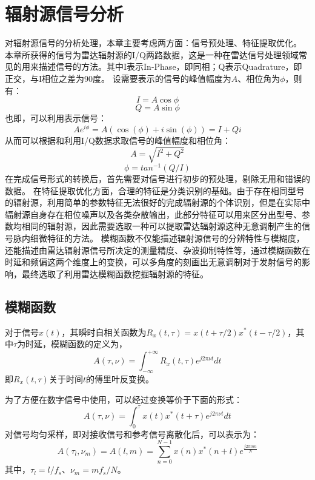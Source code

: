 \section{辐射源信号分析}
\label{sec:sei_data}
对辐射源信号的分析处理，本章主要考虑两方面：信号预处理、特征提取优化。
本章所获得的信号为雷达辐射源的I/Q两路数据，这是一种在雷达信号处理领域常见的用来描述信号的方法。其中I表示In-Phase，即同相；Q表示Quadrature，即正交，与I相位之差为90度。
设需要表示的信号的峰值幅度为$A$、相位角为$\phi$，则有：
\begin{equation}
	I = A\cos{\phi}
	\label{equ:i}
\end{equation}
\begin{equation}
	Q = A\sin{\phi}
	\label{equ:q}
\end{equation}
也即，可以利用表示信号：
\begin{equation}
	Ae^{i\phi}=A(\cos(\phi) + i\sin(\phi))=I+Qi
	\label{equ:signal}
\end{equation}
从而可以根据和利用I/Q数据求取信号的峰值幅度和相位角：
\begin{equation}
	A=\sqrt{I^2+Q^2}
\end{equation}
\begin{equation}
	\phi=tan^{-1}(Q/I)
\end{equation}
在完成信号形式的转换后，首先需要对信号进行初步的预处理，剔除无用和错误的数据。
在特征提取优化方面，合理的特征是分类识别的基础。由于存在相同型号的辐射源，利用简单的参数特征无法很好的完成辐射源的个体识别，但是在实际中辐射源自身存在相位噪声以及各类杂散输出，此部分特征可以用来区分出型号、参数均相同的辐射源，因此需要选取一种可以提取雷达辐射源这种无意调制产生的信号脉内细微特征的方法。
模糊函数不仅能描述辐射源信号的分辨特性与模糊度，还能描述由雷达辐射源信号所决定的测量精度、杂波抑制特性等，通过模糊函数在时延和频偏这两个维度上的变换，可以多角度的刻画出无意调制对于发射信号的影响，最终选取了利用雷达模糊函数挖掘辐射源的特征。
\subsection{模糊函数}
对于信号$x(t)$，其瞬时自相关函数为$R_x(t,\tau)=x(t+\tau/2)x^{*}(t-\tau/2)$，其中$\tau$为时延，模糊函数的定义为，
\begin{equation}
A(\tau,\nu) = \int_{-\infty}^{+\infty}R_x(t,\tau)e^{j2\pi\nu t}dt
\label{equ:defineaf}
\end{equation}
即$R_x(t,\tau)$关于时间$t$的傅里叶反变换。

为了方便在数字信号中使用，可以经过变换等价于下面的形式：
\begin{equation}
A(\tau,\nu) = \int_{0}^{\tau}x(t)x^{*}(t+\tau)e^{j2\pi\nu t}dt
\label{equ:afcon}
\end{equation}
对信号均匀采样，即对接收信号和参考信号离散化后，可以表示为：
\begin{equation}
A(\tau_l,\nu_m) = A(l, m) = \sum_{n = 0}^{N-1}x(n)x^{*}(n+l)e^{\frac{j2\pi m n}{N}}
\end{equation}
其中，$\tau_l=l/f_s$、$\nu_m=mf_s/N$。

